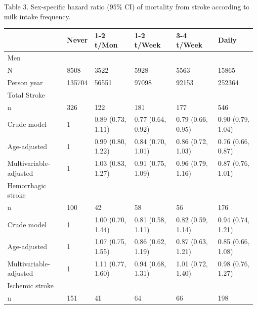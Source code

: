 \documentclass[]{tufte-handout}
\begin{document}
\begin{table}[!htbp]
Table 3. Sex-specific hazard ratio (95\% CI) of mortality from stroke according to milk intake frequency.

\centering
\fontsize{9}{11}\selectfont
\begin{tabular}[t]{llllll}
\toprule
 & Never & 1-2 t/Mon & 1-2 t/Week & 3-4 t/Week & Daily\\
\midrule
\rowcolor{gray!6}  Men &  &  &  &  & \\
N & 8508 & 3522 & 5928 & 5563 & 15865\\
\rowcolor{gray!6}  Person year & 135704 & 56551 & 97098 & 92153 & 252364\\
Total Stroke &  &  &  &  \vphantom{1} & \\
\rowcolor{gray!6}  \hspace{1em}n & 326 & 122 & 181 & 177 & 546\\
\hspace{1em}Crude model & 1 & 0.89 (0.73, 1.11) & 0.77 (0.64, 0.92) & 0.79 (0.66, 0.95) & 0.90 (0.79, 1.04)\\
\rowcolor{gray!6}  \hspace{1em}Age-adjusted & 1 & 0.99 (0.80, 1.22) & 0.84 (0.70, 1.01) & 0.86 (0.72, 1.03) & 0.76 (0.66, 0.87)\\
\hspace{1em}Multivariable-adjusted & 1 & 1.03 (0.83, 1.27) & 0.91 (0.75, 1.09) & 0.96 (0.79, 1.16) & 0.87 (0.76, 1.01)\\
\rowcolor{gray!6}  Hemorrhagic stroke &  &  &  &  \vphantom{1} & \\
\hspace{1em}n & 100 & 42 & 58 & 56 & 176\\
\rowcolor{gray!6}  \hspace{1em}Crude model & 1 & 1.00 (0.70, 1.44) & 0.81 (0.58, 1.11) & 0.82 (0.59, 1.14) & 0.94 (0.74, 1.21)\\
\hspace{1em}Age-adjusted & 1 & 1.07 (0.75, 1.55) & 0.86 (0.62, 1.19) & 0.87 (0.63, 1.21) & 0.85 (0.66, 1.08)\\
\rowcolor{gray!6}  \hspace{1em}Multivariable-adjusted & 1 & 1.11 (0.77, 1.60) & 0.94 (0.68, 1.31) & 1.01 (0.72, 1.40) & 0.98 (0.76, 1.27)\\
Ischemic stroke &  &  &  &  \vphantom{1} & \\
\rowcolor{gray!6}  \hspace{1em}n & 151 & 41 & 64 & 66 & 198\\

\end{tabular}
\end{table}
\end{document}
